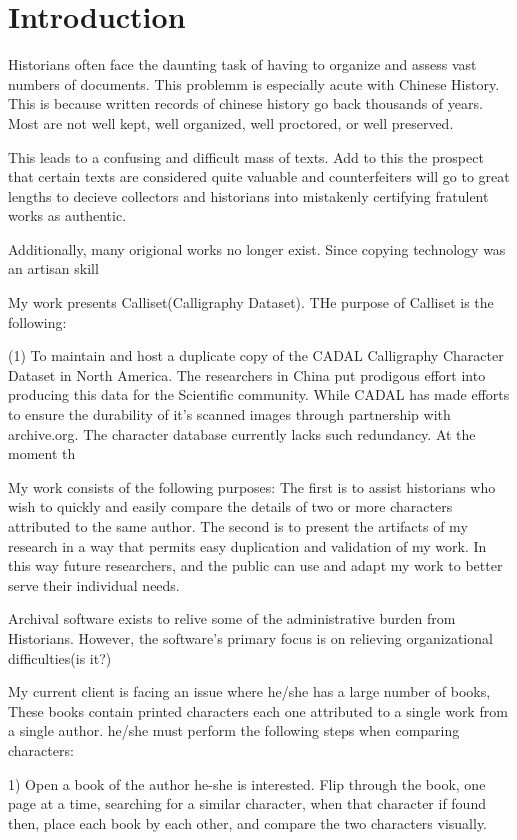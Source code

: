 \chapter{Introduction}

Historians often face the daunting task of having to organize and assess vast numbers of documents.  This problemm is especially acute with Chinese History.  This is because written records of chinese history go back thousands of years.  Most are not well kept, well organized, well proctored, or well preserved.

This leads to a confusing and difficult mass of texts.  Add to this the prospect that certain texts are considered quite valuable and counterfeiters will go to great lengths to decieve collectors and historians into mistakenly certifying fratulent works as authentic.

Additionally, many origional works no longer exist.  Since copying technology was an artisan skill 

My work presents Calliset(Calligraphy Dataset).  THe purpose of Calliset is the following:

(1)  To maintain and host a duplicate copy of the CADAL Calligraphy Character Dataset in North America.  The researchers in China put prodigous effort into producing this data for the Scientific community.  While CADAL has made efforts to ensure the durability of it's scanned images through partnership with archive.org.  The character database currently lacks such redundancy.  At the moment th


My work consists of the following purposes:
The first is to assist historians who wish to quickly and easily compare the details of two or more characters attributed to the same author.
The second is to present the artifacts of my research in a way that permits easy duplication and validation of my work.  In this way future researchers, and the public can use and adapt my work to better serve their individual needs.

Archival software exists to relive some of the administrative burden from Historians.  However, the software's primary focus is on relieving organizational difficulties(is it?)  

My current client is facing an issue where he/she has a large number of books,  These books contain printed characters each one attributed to a single work from a single author.  he/she must perform the following steps when comparing characters:

1)  Open a book of the author he-she is interested.  Flip through the book, one page at a time, searching for a similar character, when that character if found then, place each book by each other, and compare the two characters visually.

